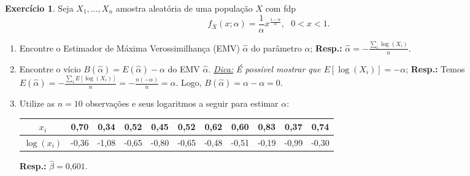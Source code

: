 \documentclass[]{article}
\theoremstyle{definition}
\newtheorem{ex}{Exercício}
\begin{document}
\begin{ex}
Seja $X_1, \ldots, X_n$ amostra aleatória de uma população $X$ com fdp
$$
f_X(x;\alpha) = \frac{1}{\alpha}x^{\frac{1-\alpha}{\alpha}}, \ \ \ 0<x<1.
$$
\begin{enumerate}
	\item Encontre o Estimador de Máxima Verossimilhança (EMV) $\hat\alpha$ do parâmetro $\alpha$; \textbf{Resp.:} $\hat\alpha = -\frac{\sum_i\log(X_i)}{n}$.
	\item Encontre o vício $B(\hat\alpha) = E(\hat\alpha) - \alpha$ do EMV $\hat\alpha$. \underline{\textit{Dica:}} \textit{É possível mostrar que $E[\log(X_i)] = -\alpha$}; \textbf{Resp.:} Temos $E(\hat\alpha) = -\frac{\sum_iE[\log(X_i)]}{n} = -\frac{n(-\alpha)}{n} = \alpha$. Logo, $B(\hat\alpha) = \alpha-\alpha = 0$.
	\item Utilize as $n=10$ observações e seus logaritmos a seguir para estimar $\alpha$:
	\begin{center}
		\begin{tabular}{c|cccccccccc}
			\hline
			$x_i$& 0,70& 0,34& 0,52& 0,45& 0,52& 0,62& 0,60& 0,83& 0,37& 0,74\\
			\hline
			$\log(x_i)$& -0,36& -1,08& -0,65& -0,80& -0,65& -0,48& -0,51& -0,19& -0,99& -0,30\\
			\hline
		\end{tabular}
	\end{center}
	\textbf{Resp.:} $\hat\beta = 0\text{,}601$.
\end{enumerate}
\end{ex}
\end{document}
